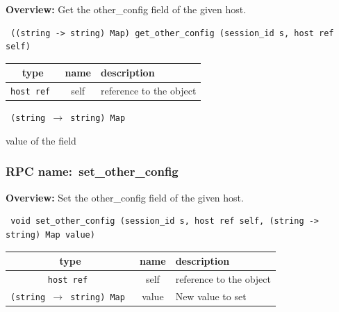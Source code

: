 {\bf Overview:} 
Get the other\_config field of the given host.

\begin{verbatim} ((string -> string) Map) get_other_config (session_id s, host ref self)\end{verbatim}



 
\vspace{0.3cm}
\begin{tabular}{|c|c|p{7cm}|}
 \hline
{\bf type} & {\bf name} & {\bf description} \\ \hline
{\tt host ref } & self & reference to the object \\ \hline 

\end{tabular}

\vspace{0.3cm}

{\tt 
(string $\rightarrow$ string) Map
}


value of the field
\vspace{0.3cm}
\vspace{0.3cm}
\vspace{0.3cm}
\subsubsection{RPC name:~set\_other\_config}

{\bf Overview:} 
Set the other\_config field of the given host.

\begin{verbatim} void set_other_config (session_id s, host ref self, (string -> string) Map value)\end{verbatim}



 
\vspace{0.3cm}
\begin{tabular}{|c|c|p{7cm}|}
 \hline
{\bf type} & {\bf name} & {\bf description} \\ \hline
{\tt host ref } & self & reference to the object \\ \hline 

{\tt (string $\rightarrow$ string) Map } & value & New value to set \\ \hline 

\end{tabular}

\vspace{0.3cm}

